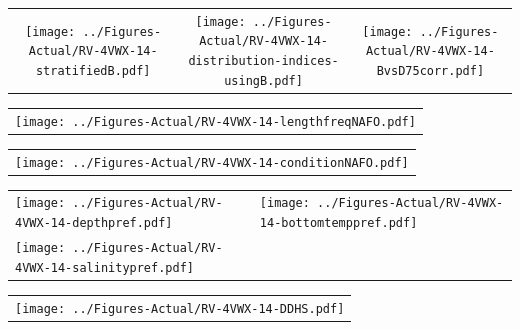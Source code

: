 \documentclass[12pt]{article}\usepackage[]{graphicx}\usepackage[]{color}
\begin{document}
\vspace{1cm}
\begin{minipage}{1.0\textwidth}
 \begin{tabular}{ccc}
\texttt{[image: ../Figures-Actual/RV-4VWX-14-stratifiedB.pdf]} & 
\texttt{[image: ../Figures-Actual/RV-4VWX-14-distribution-indices-usingB.pdf]} & 
\texttt{[image: ../Figures-Actual/RV-4VWX-14-BvsD75corr.pdf]} \\ 
\end{tabular} 
\end{minipage}
\clearpage
\begin{minipage}{1.0\textwidth}
 \begin{tabular}{c}
\texttt{[image: ../Figures-Actual/RV-4VWX-14-lengthfreqNAFO.pdf]} \\ 
\end{tabular} 
\end{minipage}
\newline

\vspace{1cm}
\begin{minipage}{1.0\textwidth}
 \begin{tabular}{c}
\texttt{[image: ../Figures-Actual/RV-4VWX-14-conditionNAFO.pdf]} \\ 
\end{tabular} 
\end{minipage}
\clearpage
\begin{minipage}{1.0\textwidth}
 \begin{tabular}[t]{m{3in}m{3in}}
\texttt{[image: ../Figures-Actual/RV-4VWX-14-depthpref.pdf]} & 
\texttt{[image: ../Figures-Actual/RV-4VWX-14-bottomtemppref.pdf]} \\ 
\texttt{[image: ../Figures-Actual/RV-4VWX-14-salinitypref.pdf]} & 
 \\ 
\end{tabular} 
\end{minipage}
\newline

\vspace{1cm}
\begin{minipage}{1.0\textwidth}
 \begin{tabular}{c}
\texttt{[image: ../Figures-Actual/RV-4VWX-14-DDHS.pdf]} \\ 
\end{tabular} 
\end{minipage}
\clearpage
\end{document}
